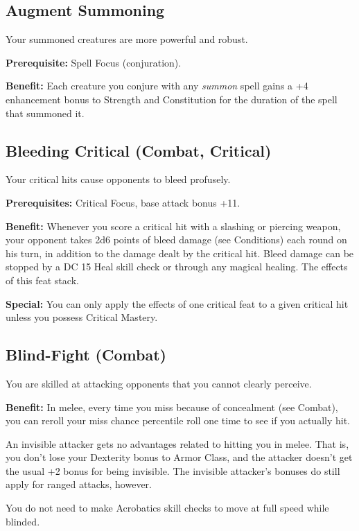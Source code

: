 \subsection{Augment Summoning}

				
Your summoned creatures are more powerful and robust.
				
\textbf{Prerequisite:} Spell Focus (conjuration).
				
\textbf{Benefit:} Each creature you conjure with any \textit{summon }spell gains a +4 enhancement bonus to Strength and Constitution for the duration of the spell that summoned it.
				
\subsection{Bleeding Critical (Combat, Critical)}

				
Your critical hits cause opponents to bleed profusely.
				
\textbf{Prerequisites:} Critical Focus, base attack bonus +11.
				
\textbf{Benefit:} Whenever you score a critical hit with a slashing or piercing weapon, your opponent takes 2d6 points of bleed damage (see Conditions) each round on his turn, in addition to the damage dealt by the critical hit. Bleed damage can be stopped by a DC 15 Heal skill check or through any magical healing. The effects of this feat stack.
				
\textbf{Special:} You can only apply the effects of one critical feat to a given critical hit unless you possess Critical Mastery.
				
\subsection{Blind-Fight (Combat)}

				
You are skilled at attacking opponents that you cannot clearly perceive.
				
\textbf{Benefit:} In melee, every time you miss because of concealment (see Combat), you can reroll your miss chance percentile roll one time to see if you actually hit.

An invisible attacker gets no advantages related to hitting you in melee. That is, you don't lose your Dexterity bonus to Armor Class, and the attacker doesn't get the usual +2 bonus for being invisible. The invisible attacker's bonuses do still apply for ranged attacks, however.

You do not need to make Acrobatics skill checks to move at full speed while blinded.
				
